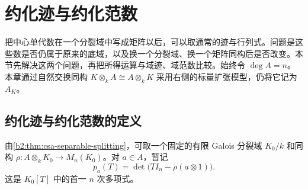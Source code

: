 
\section{约化迹与约化范数}
\label{b2:sec:1803}

把中心单代数在一个分裂域中写成矩阵以后，可以取通常的迹与行列式。问题是这些数是否仍属于原来的底域，以及换一个分裂域、换一个矩阵同构后是否改变。本节先解决这两个问题，再把所得运算与域迹、域范数比较。始终令 \(\deg A=n\)。本章通过自然交换同构 \(K\otimes_kA\cong A\otimes_kK\) 采用右侧的标量扩张模型，仍将它记为 \(A_K\)。

%
%

\subsection{约化迹与约化范数的定义}
\label{b2:subsec:1803:01}

由\cref{b2:thm:csa-separable-splitting}，可取一个固定的有限 Galois 分裂域 \(K_0/k\) 和同构 \(\rho:A\otimes_kK_0\to M_n(K_0)\)。对 \(a\in A\)，暂记
\[
	p_a(T)=\det\bigl(TI_n-\rho(a\otimes1)\bigr).
\]
这是 \(K_0[T]\) 中的首一 \(n\) 次多项式。

